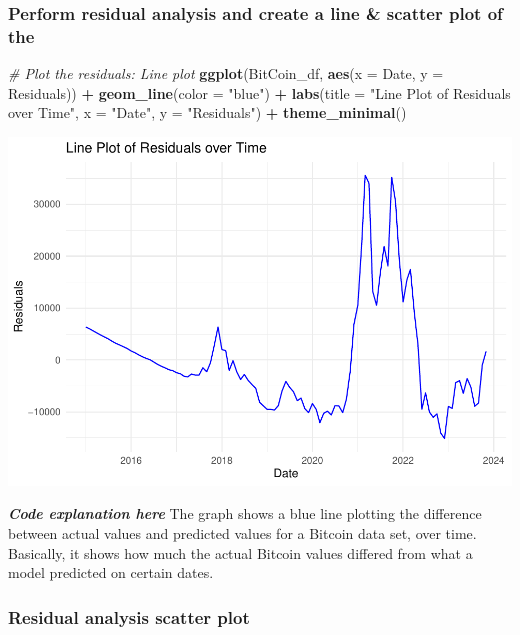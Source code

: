 \documentclass[
]{book}
\newenvironment{Shaded}{\begin{snugshade}}{\end{snugshade}}
\newcommand{\AttributeTok}[1]{\textcolor[rgb]{0.13,0.29,0.53}{#1}}
\newcommand{\CommentTok}[1]{\textcolor[rgb]{0.56,0.35,0.01}{\textit{#1}}}
\newcommand{\FunctionTok}[1]{\textcolor[rgb]{0.13,0.29,0.53}{\textbf{#1}}}
\newcommand{\NormalTok}[1]{#1}
\newcommand{\SpecialCharTok}[1]{\textcolor[rgb]{0.81,0.36,0.00}{\textbf{#1}}}
\newcommand{\StringTok}[1]{\textcolor[rgb]{0.31,0.60,0.02}{#1}}
\begin{document}
\subsubsection{Perform residual analysis and create a line \& scatter plot of the}\label{perform-residual-analysis-and-create-a-line-scatter-plot-of-the}

\begin{Shaded}
\begin{Highlighting}[]
\CommentTok{\# Plot the residuals: Line plot}
\FunctionTok{ggplot}\NormalTok{(BitCoin\_df, }\FunctionTok{aes}\NormalTok{(}\AttributeTok{x =}\NormalTok{ Date, }\AttributeTok{y =}\NormalTok{ Residuals)) }\SpecialCharTok{+}
  \FunctionTok{geom\_line}\NormalTok{(}\AttributeTok{color =} \StringTok{"blue"}\NormalTok{) }\SpecialCharTok{+}
  \FunctionTok{labs}\NormalTok{(}\AttributeTok{title =} \StringTok{"Line Plot of Residuals over Time"}\NormalTok{,}
       \AttributeTok{x =} \StringTok{"Date"}\NormalTok{,}
       \AttributeTok{y =} \StringTok{"Residuals"}\NormalTok{) }\SpecialCharTok{+}
  \FunctionTok{theme\_minimal}\NormalTok{()}
\end{Highlighting}
\end{Shaded}

\includegraphics{bookdown-demo_files/figure-latex/unnamed-chunk-20-1.pdf}

\emph{\textbf{Code explanation here}}
The graph shows a blue line plotting the difference between actual values and predicted values for a Bitcoin data set, over time. Basically, it shows how much the actual Bitcoin values differed from what a model predicted on certain dates.

\subsubsection{Residual analysis scatter plot}\label{residual-analysis-scatter-plot}
\end{document}
